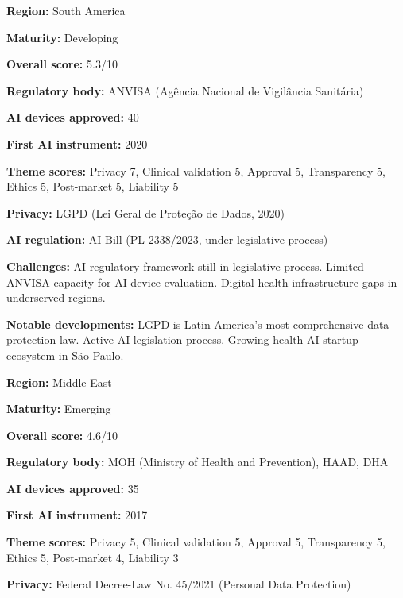 \vspace{0.55em}
\par
\vspace{0.15em}
\noindent\textbf{Region:} South America\par
\noindent\textbf{Maturity:} Developing\par
\noindent\textbf{Overall score:} 5.3/10\par
\noindent\textbf{Regulatory body:} ANVISA (Agência Nacional de Vigilância Sanitária)\par
\noindent\textbf{AI devices approved:} 40\par
\noindent\textbf{First AI instrument:} 2020\par
\noindent\textbf{Theme scores:} Privacy 7, Clinical validation 5, Approval 5, Transparency 5, Ethics 5, Post-market 5, Liability 5\par
\noindent\textbf{Privacy:} LGPD (Lei Geral de Proteção de Dados, 2020)\par
\noindent\textbf{AI regulation:} AI Bill (PL 2338/2023, under legislative process)\par
\noindent\textbf{Challenges:} AI regulatory framework still in legislative process. Limited ANVISA capacity for AI device evaluation. Digital health infrastructure gaps in underserved regions.\par
\noindent\textbf{Notable developments:} LGPD is Latin America's most comprehensive data protection law. Active AI legislation process. Growing health AI startup ecosystem in São Paulo.\par
\vspace{0.55em}
\par
\vspace{0.15em}
\noindent\textbf{Region:} Middle East\par
\noindent\textbf{Maturity:} Emerging\par
\noindent\textbf{Overall score:} 4.6/10\par
\noindent\textbf{Regulatory body:} MOH (Ministry of Health and Prevention), HAAD, DHA\par
\noindent\textbf{AI devices approved:} 35\par
\noindent\textbf{First AI instrument:} 2017\par
\noindent\textbf{Theme scores:} Privacy 5, Clinical validation 5, Approval 5, Transparency 5, Ethics 5, Post-market 4, Liability 3\par
\noindent\textbf{Privacy:} Federal Decree-Law No. 45/2021 (Personal Data Protection)\par
